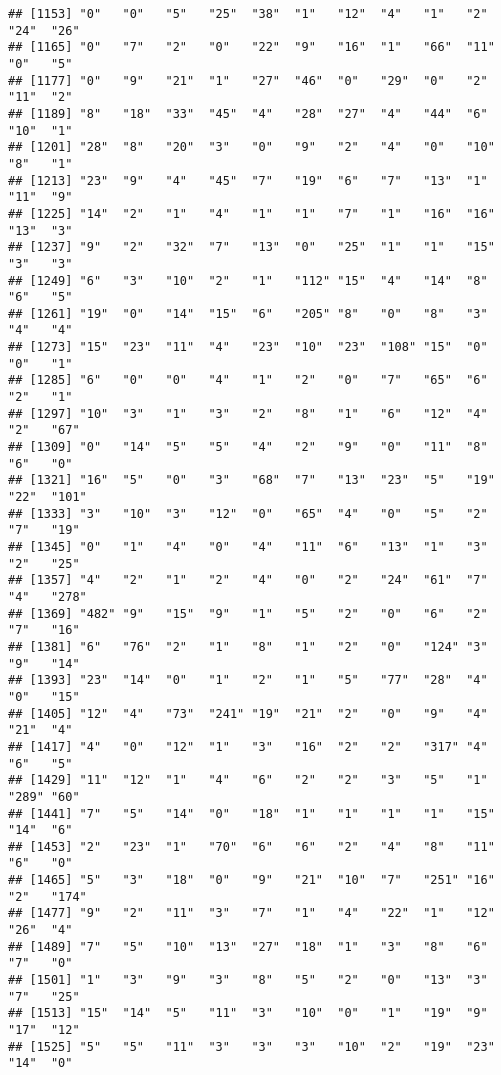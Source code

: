 \documentclass[
]{article}
\begin{document}
\begin{verbatim}
## [1153] "0"   "0"   "5"   "25"  "38"  "1"   "12"  "4"   "1"   "2"   "24"  "26" 
## [1165] "0"   "7"   "2"   "0"   "22"  "9"   "16"  "1"   "66"  "11"  "0"   "5"  
## [1177] "0"   "9"   "21"  "1"   "27"  "46"  "0"   "29"  "0"   "2"   "11"  "2"  
## [1189] "8"   "18"  "33"  "45"  "4"   "28"  "27"  "4"   "44"  "6"   "10"  "1"  
## [1201] "28"  "8"   "20"  "3"   "0"   "9"   "2"   "4"   "0"   "10"  "8"   "1"  
## [1213] "23"  "9"   "4"   "45"  "7"   "19"  "6"   "7"   "13"  "1"   "11"  "9"  
## [1225] "14"  "2"   "1"   "4"   "1"   "1"   "7"   "1"   "16"  "16"  "13"  "3"  
## [1237] "9"   "2"   "32"  "7"   "13"  "0"   "25"  "1"   "1"   "15"  "3"   "3"  
## [1249] "6"   "3"   "10"  "2"   "1"   "112" "15"  "4"   "14"  "8"   "6"   "5"  
## [1261] "19"  "0"   "14"  "15"  "6"   "205" "8"   "0"   "8"   "3"   "4"   "4"  
## [1273] "15"  "23"  "11"  "4"   "23"  "10"  "23"  "108" "15"  "0"   "0"   "1"  
## [1285] "6"   "0"   "0"   "4"   "1"   "2"   "0"   "7"   "65"  "6"   "2"   "1"  
## [1297] "10"  "3"   "1"   "3"   "2"   "8"   "1"   "6"   "12"  "4"   "2"   "67" 
## [1309] "0"   "14"  "5"   "5"   "4"   "2"   "9"   "0"   "11"  "8"   "6"   "0"  
## [1321] "16"  "5"   "0"   "3"   "68"  "7"   "13"  "23"  "5"   "19"  "22"  "101"
## [1333] "3"   "10"  "3"   "12"  "0"   "65"  "4"   "0"   "5"   "2"   "7"   "19" 
## [1345] "0"   "1"   "4"   "0"   "4"   "11"  "6"   "13"  "1"   "3"   "2"   "25" 
## [1357] "4"   "2"   "1"   "2"   "4"   "0"   "2"   "24"  "61"  "7"   "4"   "278"
## [1369] "482" "9"   "15"  "9"   "1"   "5"   "2"   "0"   "6"   "2"   "7"   "16" 
## [1381] "6"   "76"  "2"   "1"   "8"   "1"   "2"   "0"   "124" "3"   "9"   "14" 
## [1393] "23"  "14"  "0"   "1"   "2"   "1"   "5"   "77"  "28"  "4"   "0"   "15" 
## [1405] "12"  "4"   "73"  "241" "19"  "21"  "2"   "0"   "9"   "4"   "21"  "4"  
## [1417] "4"   "0"   "12"  "1"   "3"   "16"  "2"   "2"   "317" "4"   "6"   "5"  
## [1429] "11"  "12"  "1"   "4"   "6"   "2"   "2"   "3"   "5"   "1"   "289" "60" 
## [1441] "7"   "5"   "14"  "0"   "18"  "1"   "1"   "1"   "1"   "15"  "14"  "6"  
## [1453] "2"   "23"  "1"   "70"  "6"   "6"   "2"   "4"   "8"   "11"  "6"   "0"  
## [1465] "5"   "3"   "18"  "0"   "9"   "21"  "10"  "7"   "251" "16"  "2"   "174"
## [1477] "9"   "2"   "11"  "3"   "7"   "1"   "4"   "22"  "1"   "12"  "26"  "4"  
## [1489] "7"   "5"   "10"  "13"  "27"  "18"  "1"   "3"   "8"   "6"   "7"   "0"  
## [1501] "1"   "3"   "9"   "3"   "8"   "5"   "2"   "0"   "13"  "3"   "7"   "25" 
## [1513] "15"  "14"  "5"   "11"  "3"   "10"  "0"   "1"   "19"  "9"   "17"  "12" 
## [1525] "5"   "5"   "11"  "3"   "3"   "3"   "10"  "2"   "19"  "23"  "14"  "0"  

\end{verbatim}
\end{document}
